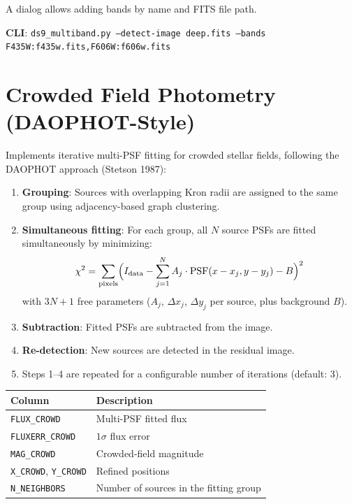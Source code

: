 \documentclass[11pt,fleqn]{book}
\begin{document}
A dialog allows adding bands by name and FITS file path.

\textbf{CLI}: \texttt{ds9\_multiband.py --detect-image deep.fits --bands F435W:f435w.fits,F606W:f606w.fits}


\section{Crowded Field Photometry (DAOPHOT-Style)}

Implements iterative multi-PSF fitting for crowded stellar fields, following the DAOPHOT approach (Stetson 1987):

\begin{enumerate}[leftmargin=2em]
  \item \textbf{Grouping}: Sources with overlapping Kron radii are assigned to the same group using adjacency-based graph clustering.
  \item \textbf{Simultaneous fitting}: For each group, all $N$ source PSFs are fitted simultaneously by minimizing:
  \begin{equation}
    \chi^2 = \sum_\text{pixels} \Bigl(I_\text{data} - \sum_{j=1}^N A_j \cdot \text{PSF}(x - x_j, y - y_j) - B\Bigr)^2
  \end{equation}
  with $3N + 1$ free parameters ($A_j$, $\Delta x_j$, $\Delta y_j$ per source, plus background $B$).
  \item \textbf{Subtraction}: Fitted PSFs are subtracted from the image.
  \item \textbf{Re-detection}: New sources are detected in the residual image.
  \item Steps 1--4 are repeated for a configurable number of iterations (default: 3).
\end{enumerate}

\begin{center}
\begin{tabular}{ll}
\toprule
\textbf{Column} & \textbf{Description} \\
\midrule
\texttt{FLUX\_CROWD} & Multi-PSF fitted flux \\
\texttt{FLUXERR\_CROWD} & $1\sigma$ flux error \\
\texttt{MAG\_CROWD} & Crowded-field magnitude \\
\texttt{X\_CROWD}, \texttt{Y\_CROWD} & Refined positions \\
\texttt{N\_NEIGHBORS} & Number of sources in the fitting group \\
\bottomrule
\end{tabular}
\end{center}
\end{document}
